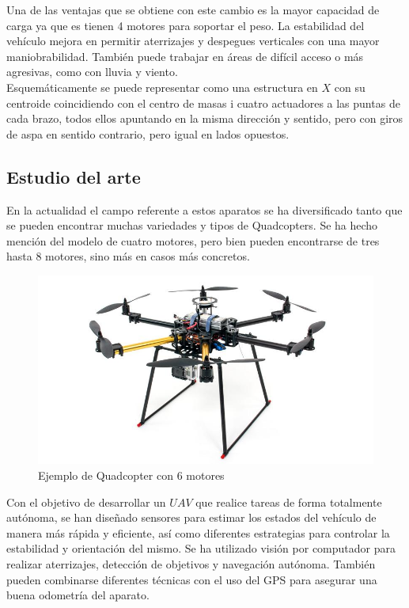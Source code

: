 \documentclass[twoside]{article}
\begin{document}
Una de las ventajas que se obtiene con este cambio es la mayor capacidad de carga ya que es tienen 4 motores  para soportar el peso. La estabilidad del vehículo mejora en permitir aterrizajes y despegues verticales con una mayor maniobrabilidad. También puede trabajar en áreas de difícil acceso o más agresivas, como con lluvia y viento. \\

Esquemáticamente se puede representar como una estructura en $X$ con su centroide coincidiendo con el centro de masas i cuatro actuadores a las puntas de cada brazo, todos ellos apuntando en la misma dirección y sentido, pero con giros de aspa en sentido contrario, pero igual en lados opuestos.


\subsection{Estudio del arte}

En la actualidad el campo referente a estos aparatos se ha diversificado tanto que se pueden encontrar muchas variedades y tipos de Quadcopters. Se ha hecho mención del modelo de cuatro motores, pero bien pueden encontrarse de tres hasta 8 motores, sino más en casos más concretos. \\

\begin{figure}[h!]
\begin{center}
\includegraphics[scale=0.3]{images/6_armed_quadcopter.jpg}
\caption{Ejemplo de Quadcopter con 6 motores}
\end{center}
\end{figure}

Con el objetivo de desarrollar un $UAV$ que realice tareas de forma totalmente autónoma, se han diseñado sensores para estimar los estados del vehículo de manera más rápida y eficiente, así como diferentes estrategias para controlar la estabilidad y orientación del mismo. Se ha utilizado visión  por computador para realizar aterrizajes, detección de objetivos y navegación autónoma. También pueden combinarse diferentes técnicas con el uso del GPS para asegurar una buena odometría del aparato. \\
\end{document}
